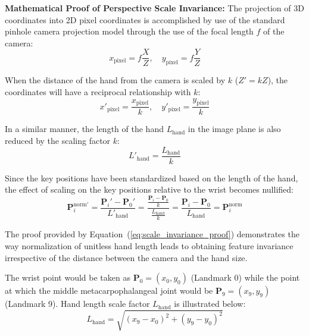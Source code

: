 \textbf{Mathematical Proof of Perspective Scale Invariance:} 
The projection of 3D coordinates into 2D pixel coordinates is accomplished by use of the standard pinhole camera projection model through the use of the focal length $f$ of the camera:
\begin{equation}
x_{\text{pixel}} = f \frac{X}{Z}, \quad y_{\text{pixel}} = f \frac{Y}{Z}
\label{eq:pinhole_projection}
\end{equation}

When the distance of the hand from the camera is scaled by $k$ ($Z' = k Z$), the coordinates will have a reciprocal relationship with $k$:
\begin{equation}
x'_{\text{pixel}} = \frac{x_{\text{pixel}}}{k}, \quad y'_{\text{pixel}} = \frac{y_{\text{pixel}}}{k}
\label{eq:pixel_scaling}
\end{equation}

In a similar manner, the length of the hand $L_{\text{hand}}$ in the image plane is also reduced by the scaling factor $k$:
\begin{equation}
L'_{\text{hand}} = \frac{L_{\text{hand}}}{k}
\label{eq:hand_length_scaling}
\end{equation}

Since the key positions have been standardized based on the length of the hand, the effect of scaling on the key positions relative to the wrist becomes nullified:
\begin{equation}
\mathbf{P}_i^{\text{norm}\prime} = \frac{\mathbf{P}_i' - \mathbf{P}_0'}{L'_{\text{hand}}} = \frac{\frac{\mathbf{P}_i - \mathbf{P}_0}{k}}{\frac{L_{\text{hand}}}{k}} = \frac{\mathbf{P}_i - \mathbf{P}_0}{L_{\text{hand}}} = \mathbf{P}_i^{\text{norm}}
\label{eq:scale_invariance_proof}
\end{equation}

The proof provided by Equation~(\ref{eq:scale_invariance_proof}) demonstrates the way normalization of unitless hand length leads to obtaining feature invariance irrespective of the distance between the camera and the hand size.

The wrist point would be taken as $\mathbf{P}_0 = (x_0, y_0)$ (Landmark 0) while the point at which the middle metacarpophalangeal joint would be $\mathbf{P}_9 = (x_9, y_9)$ (Landmark 9). Hand length scale factor $L_{\text{hand}}$ is illustrated below:
\begin{equation}
L_{\text{hand}} = \sqrt{(x_9 - x_0)^2 + (y_9 - y_0)^2}
\label{eq:hand_length_scale_def}
\end{equation}

